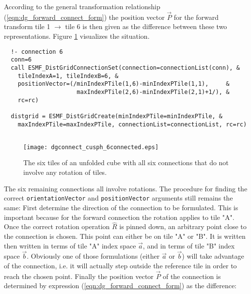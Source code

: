    According to the general transformation relationship 
   (\ref{eqn:dg_forward_connect_form}) the position vector $\vec P$ for the 
   forward transform tile 1 $\rightarrow$ tile 6 is then given as the 
   difference between these two representations. Figure 
   \ref{fig:dgconnect_cusph_6connected} visualizes the situation. 

 \begin{verbatim}
  !- connection 6
  conn=6
  call ESMF_DistGridConnectionSet(connection=connectionList(conn), &
    tileIndexA=1, tileIndexB=6, &
    positionVector=(/minIndexPTile(1,6)-minIndexPTile(1,1),     &
                     maxIndexPTile(2,6)-minIndexPTile(2,1)+1/), &
    rc=rc)
  
  distgrid = ESMF_DistGridCreate(minIndexPTile=minIndexPTile, &
    maxIndexPTile=maxIndexPTile, connectionList=connectionList, rc=rc)
 
\end{verbatim}
 

   
   \begin{figure}[h]
     \caption{The six tiles of an unfolded cube with all six connections that
      do not involve any rotation of tiles.}
     \centering
     \texttt{[image: dgconnect\_cusph\_6connected.eps]}
     \label{fig:dgconnect_cusph_6connected}
   \end{figure}
  
   The six remaining connections all involve rotations. The procedure for finding
   the correct {\tt orientationVector} and {\tt positionVector} arguments
   still remains the same: First determine the direction of the connection
   to be formulated. This is important because for the forward connection the
   rotation applies to tile "A". Once the correct rotation operation $\hat R$ is
   pinned down, an arbitrary point close to the connection is chosen. This point
   can either be on tile "A" or "B". It is written then written in terms of tile
   "A" index space $\vec a$, and in terms of tile "B" index space $\vec b$. 
   Obviously one of those formulations (either $\vec a$ or $\vec b$) will take
   advantage of the connection, i.e. it will actually step outside the reference
   tile in order to reach the chosen point. Finally the position vector $\vec P$ 
   of the connection is determined by expression 
   (\ref{eqn:dg_forward_connect_form}) as the difference:
  
